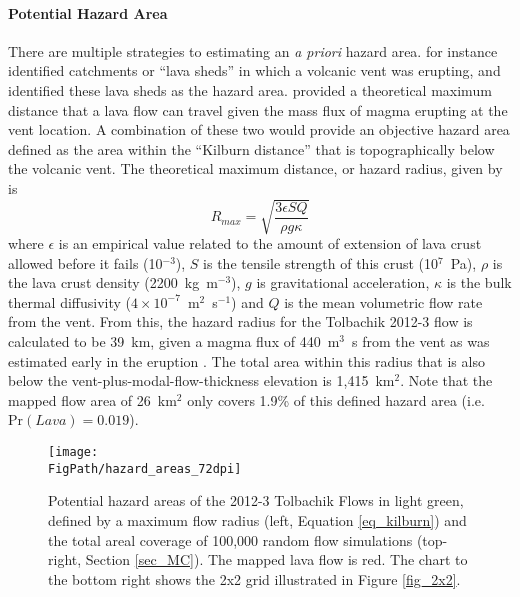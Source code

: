 	\paragraph{Potential Hazard Area} There are multiple strategies to estimating an \textit{a priori} hazard area. \citet{kauahikaua1995applications} for instance identified catchments or ``lava sheds'' in which a volcanic vent was erupting, and identified these lava sheds as the hazard area. \citet{kilburn2000lava} provided a theoretical maximum distance that a lava flow can travel given the mass flux of magma erupting at the vent location. A combination of these two would provide an objective hazard area defined as the area within the ``Kilburn distance'' that is topographically below the volcanic vent. The theoretical maximum distance, or hazard radius, given by \citet{kilburn2000lava} is
		\begin{equation}
		R_{max}=\sqrt{\frac{3\epsilon SQ}{\rho g\kappa}}
		\label{eq_kilburn}
		\end{equation}
	where $\epsilon$ is an empirical value related to the amount of extension of lava crust allowed before it fails (10$^{-3}$), $S$ is the tensile strength of this crust (10$^7$~Pa), $\rho$ is the lava crust density (2200~kg~m$^{-3}$), $g$ is gravitational acceleration, $\kappa$ is the bulk thermal diffusivity ($4\times 10^{-7}$~m$^{2}$~s$^{-1}$) and $Q$ is the mean volumetric flow rate from the vent. From this, the hazard radius for the Tolbachik 2012-3 flow is calculated to be 39~km, given a magma flux of 440~m$^3$~s from the vent as was estimated early in the eruption \citep{belousov2015overview}. The total area within this radius that is also below the vent-plus-modal-flow-thickness elevation is 1,415~km$^2$. Note that the mapped flow area of 26~km$^2$ only covers 1.9\% of this defined hazard area (i.e. $\text{Pr}(Lava) = 0.019$).
	
		\begin{figure}
			\centering
			\texttt{[image: \\FigPath/hazard\_areas\_72dpi]}
			\caption[Potential hazard areas of the 2012-3 Tolbachik Flows]{Potential hazard areas of the 2012-3 Tolbachik Flows in light green, defined by a maximum flow radius (left, Equation \ref{eq_kilburn}) and the total areal coverage of 100,000 random flow simulations (top-right, Section \ref{sec_MC}). The mapped lava flow is red. The chart to the bottom right shows the 2x2 grid illustrated in Figure \ref{fig_2x2}.}
			\label{fig_hazardarea}
		\end{figure}
	
